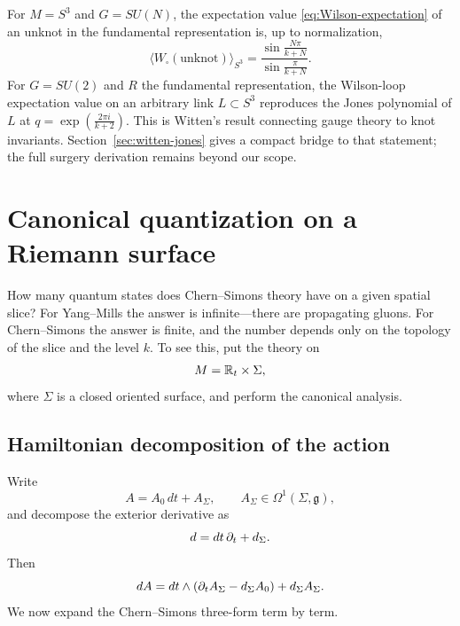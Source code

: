 \noindent For $M = S^3$ and $G = SU(N)$, the expectation value \eqref{eq:Wilson-expectation} of an unknot in the fundamental representation is, up to normalization,
\begin{equation*}
\langle W_{\square}(\text{unknot})\rangle_{S^3} = \frac{\sin\frac{N\pi}{k+N}}{\sin\frac{\pi}{k+N}}.
\end{equation*}
For $G=SU(2)$ and $R$ the fundamental representation, the Wilson-loop expectation value on an arbitrary link $L\subset S^3$ reproduces the Jones polynomial of $L$ at $q = \exp\left(\frac{2\pi i}{k+2}\right)$. This is Witten's result \cite{Witten1989Jones} connecting gauge theory to knot invariants. Section~\ref{sec:witten-jones} gives a compact bridge to that statement; the full surgery derivation remains beyond our scope.

\section{Canonical quantization on a Riemann surface}\label{sec:hilbert}

How many quantum states does Chern--Simons theory have on a given spatial slice?  For Yang--Mills the answer is infinite---there are propagating gluons.  For Chern--Simons the answer is finite, and the number depends only on the topology of the slice and the level $k$.  To see this, put the theory on
\begin{equation*}
M = \mathbb{R}_t\times \Sigma,
\end{equation*}
where $\Sigma$ is a closed oriented surface, and perform the canonical analysis.

\subsection{Hamiltonian decomposition of the action}

Write
\begin{equation*}
A = A_0\,dt + A_\Sigma,
\qquad
A_\Sigma \in \Omega^1(\Sigma,\mathfrak{g}),
\end{equation*}
and decompose the exterior derivative as
\begin{equation*}
d = dt\,\partial_t + d_\Sigma.
\end{equation*}
Then
\begin{equation}\label{eq:dA-split}
dA = dt\wedge(\partial_t A_\Sigma - d_\Sigma A_0) + d_\Sigma A_\Sigma.
\end{equation}
We now expand the Chern--Simons three-form term by term.

